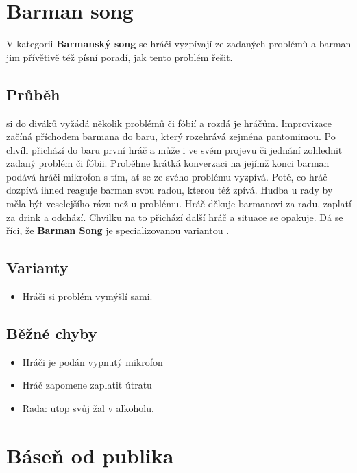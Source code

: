 \needspace{5cm}

\section{Barman song} 
\label{barman song} 



V kategorii \textbf{Barmanský song}{} se hráči vyzpívají ze zadaných problémů a barman jim přívětivě též písní poradí, jak tento problém řešit.  
 
\subsection{ Průběh }  si do diváků vyžádá několik problémů či fóbií a rozdá je hráčům. Improvizace začíná příchodem barmana do baru, který rozehrává zejména pantomimou. Po chvíli přichází do baru první hráč a může i ve svém projevu či jednání zohlednit zadaný problém či fóbii. Proběhne krátká konverzaci na jejímž konci barman podává hráči mikrofon s tím, ať se ze svého problému vyzpívá. Poté, co hráč dozpívá ihned reaguje barman svou radou, kterou též zpívá. Hudba u rady by měla být veselejšího rázu než u problému. Hráč děkuje barmanovi za radu, zaplatí za drink a odchází. Chvilku na to přichází další hráč a situace se opakuje. 
Dá se říci, že \textbf{Barman Song}{} je specializovanou variantou . 
 
\subsection{ Varianty } \begin{itemize}
\item Hráči si problém vymýšlí sami.
\end{itemize}
 
 
\subsection{ Běžné chyby} \begin{itemize}
\item  Hráči je podán vypnutý mikrofon
\item  Hráč zapomene zaplatit útratu
\item  Rada: utop svůj žal v alkoholu.
\end{itemize}
 
 
 
  
  
 
\needspace{5cm} \section{Báseň od publika} \label{báseň od publika}  
 
